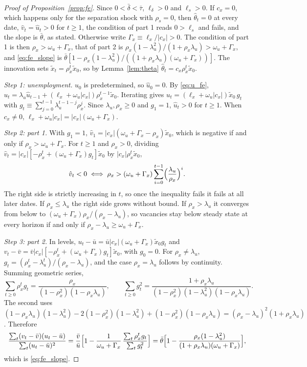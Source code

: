 \documentclass[authoryear, review, 12pt]{elsarticle}
\begin{document}
\begin{proof}[Proof of Proposition~\ref{prop:fe}]
Since $0<\bar\delta<\bar\tau$, $\ell_\delta>0$ and $\ell_s>0$. If $c_x=0$, which happens only
for the separation shock with $\rho_s=0$, then $\hat\theta_t=0$ at every date,
$\hat{v}_t=\hat{u}_t>0$ for $t\geq1$, the condition of part 1 reads $0>\ell_s$ and fails,
and the slope is $\bar\theta$, as stated. Otherwise write $\Gamma_x\equiv\ell_x/|c_x|>0$.
The condition of part 1 is then $\rho_x>\omega_u+\Gamma_x$, that of part 2 is
$\rho_x(1-\lambda_u^2)/(1+\rho_x\lambda_u)>\omega_u+\Gamma_x$, and \eqref{eq:fe_slope} is
$\bar\theta[1-\rho_x(1-\lambda_u^2)/((1+\rho_x\lambda_u)(\omega_u+\Gamma_x))]$.
The innovation sets $\tilde{x}_t=\rho_x^t\tilde{x}_0$, so by Lemma~\ref{lem:theta}
$\hat\theta_t=c_x\rho_x^t\tilde{x}_0$.

\emph{Step 1: unemployment.} $u_0$ is predetermined, so $\hat{u}_0=0$. By \eqref{eq:u_fe},
$\hat{u}_t=\lambda_u\hat{u}_{t-1}+(\ell_x+\omega_u|c_x|)\rho_x^{t-1}\tilde{x}_0$. Iterating gives
$\hat{u}_t=(\ell_x+\omega_u|c_x|)\tilde{x}_0\,g_t$ with
$g_t\equiv\sum_{j=0}^{t-1}\lambda_u^{t-1-j}\rho_x^j$. Since $\lambda_u,\rho_x\geq0$ and
$g_1=1$, $\hat{u}_t>0$ for $t\geq1$. When $c_x\neq0$,
$\ell_x+\omega_u|c_x|=|c_x|(\omega_u+\Gamma_x)$.

\emph{Step 2: part 1.} With $g_1=1$,
$\hat{v}_1=|c_x|(\omega_u+\Gamma_x-\rho_x)\tilde{x}_0$, which is negative if and only if
$\rho_x>\omega_u+\Gamma_x$. For $t\geq1$ and $\rho_x>0$, dividing
$\hat{v}_t=|c_x|[-\rho_x^t+(\omega_u+\Gamma_x)g_t]\tilde{x}_0$ by $|c_x|\rho_x^t\tilde{x}_0$,
\[
	\hat{v}_t<0\iff\rho_x>(\omega_u+\Gamma_x)\sum_{i=0}^{t-1}\Bigl(\frac{\lambda_u}{\rho_x}\Bigr)^i .
\]
The right side is strictly increasing in $t$, so once the inequality fails it fails at all
later dates. If $\rho_x\leq\lambda_u$ the right side grows without bound. If
$\rho_x>\lambda_u$ it converges from below to $(\omega_u+\Gamma_x)\rho_x/(\rho_x-\lambda_u)$,
so vacancies stay below steady state at every horizon if and only if
$\rho_x-\lambda_u\geq\omega_u+\Gamma_x$.

\emph{Step 3: part 2.} In levels, $u_t-\bar{u}=\bar{u}|c_x|(\omega_u+\Gamma_x)\tilde{x}_0g_t$ and
$v_t-\bar{v}=\bar{v}|c_x|[-\rho_x^t+(\omega_u+\Gamma_x)g_t]\tilde{x}_0$, with $g_0=0$. For
$\rho_x\neq\lambda_u$, $g_t=(\rho_x^t-\lambda_u^t)/(\rho_x-\lambda_u)$, and the case
$\rho_x=\lambda_u$ follows by continuity. Summing geometric series,
\[
	\sum_{t\geq0}\rho_x^tg_t=\frac{\rho_x}{(1-\rho_x^2)(1-\rho_x\lambda_u)},\qquad
	\sum_{t\geq0}g_t^2=\frac{1+\rho_x\lambda_u}{(1-\rho_x^2)(1-\lambda_u^2)(1-\rho_x\lambda_u)} .
\]
The second uses
$(1-\rho_x\lambda_u)(1-\lambda_u^2)-2(1-\rho_x^2)(1-\lambda_u^2)+(1-\rho_x^2)(1-\rho_x\lambda_u)
=(\rho_x-\lambda_u)^2(1+\rho_x\lambda_u)$. Therefore
\[
	\frac{\sum_t(v_t-\bar{v})(u_t-\bar{u})}{\sum_t(u_t-\bar{u})^2}
	=\frac{\bar{v}}{\bar{u}}\Bigl[1-\frac{1}{\omega_u+\Gamma_x}\,\frac{\sum_t\rho_x^tg_t}{\sum_tg_t^2}\Bigr]
	=\bar\theta\Bigl[1-\frac{\rho_x(1-\lambda_u^2)}{(1+\rho_x\lambda_u)(\omega_u+\Gamma_x)}\Bigr],
\]
which is \eqref{eq:fe_slope}.


\end{proof}
\end{document}

